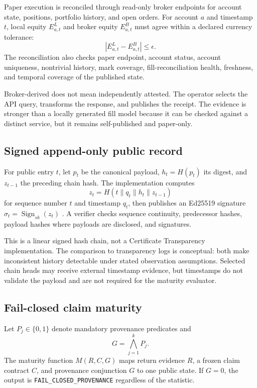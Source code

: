 \documentclass[11pt]{article}
\newcommand{\status}[1]{\texttt{#1}}
\begin{document}
Paper execution is reconciled through read-only broker endpoints for account state, positions, portfolio history, and open orders. For account $a$ and timestamp $t$, local equity $E^{L}_{a,t}$ and broker equity $E^{B}_{a,t}$ must agree within a declared currency tolerance:
\begin{equation}
  |E^{L}_{a,t} - E^{B}_{a,t}| \leq \epsilon.
\end{equation}
The reconciliation also checks paper endpoint, account status, account uniqueness, nontrivial history, mark coverage, fill-reconciliation health, freshness, and temporal coverage of the published state.

Broker-derived does not mean independently attested. The operator selects the API query, transforms the response, and publishes the receipt. The evidence is stronger than a locally generated fill model because it can be checked against a distinct service, but it remains self-published and paper-only.

\subsection{Signed append-only public record}

For public entry $t$, let $p_t$ be the canonical payload, $h_t=H(p_t)$ its digest, and $z_{t-1}$ the preceding chain hash. The implementation computes
\begin{equation}
  z_t = H(t \parallel q_t \parallel h_t \parallel z_{t-1})
\end{equation}
for sequence number $t$ and timestamp $q_t$, then publishes an Ed25519 signature $\sigma_t=\operatorname{Sign}_{sk}(z_t)$ \cite{josefsson2017eddsa}. A verifier checks sequence continuity, predecessor hashes, payload hashes where payloads are disclosed, and signatures.

This is a linear signed hash chain, not a Certificate Transparency implementation. The comparison to transparency logs is conceptual: both make inconsistent history detectable under stated observation assumptions. Selected chain heads may receive external timestamp evidence, but timestamps do not validate the payload and are not required for the maturity evaluator.

\subsection{Fail-closed claim maturity}

Let $P_j \in \{0,1\}$ denote mandatory provenance predicates and
\begin{equation}
  G = \bigwedge_{j=1}^{k} P_j.
\end{equation}
The maturity function $M(R,C,G)$ maps return evidence $R$, a frozen claim contract $C$, and provenance conjunction $G$ to one public state. If $G=0$, the output is \status{FAIL\_CLOSED\_PROVENANCE} regardless of the statistic.
\end{document}
